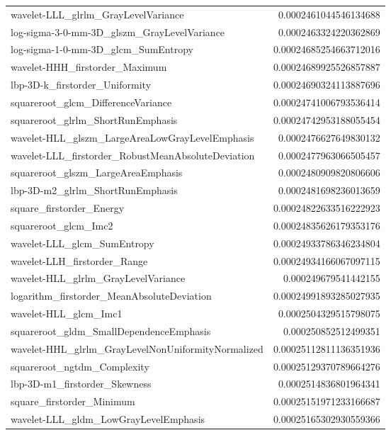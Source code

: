{\begin{xltabular}[H]{\textwidth}{X r}
        wavelet-LLL\_glrlm\_GrayLevelVariance & 0.0002461044546134688 \\
        log-sigma-3-0-mm-3D\_glszm\_GrayLevelVariance & 0.0002463324220362869 \\
        log-sigma-1-0-mm-3D\_glcm\_SumEntropy & 0.00024685254663712016 \\
        wavelet-HHH\_firstorder\_Maximum & 0.00024689925526857887 \\
        lbp-3D-k\_firstorder\_Uniformity & 0.00024690324113887696 \\
        squareroot\_glcm\_DifferenceVariance & 0.00024741006793536414 \\
        squareroot\_glrlm\_ShortRunEmphasis & 0.00024742953188055454 \\
        wavelet-HLL\_glszm\_LargeAreaLowGrayLevelEmphasis & 0.0002476627649830132 \\
        wavelet-LLL\_firstorder\_RobustMeanAbsoluteDeviation & 0.0002477963066505457 \\
        squareroot\_glszm\_LargeAreaEmphasis & 0.0002480909820806606 \\
        lbp-3D-m2\_glrlm\_ShortRunEmphasis & 0.0002481698236013659 \\
        square\_firstorder\_Energy & 0.00024822633516222923 \\
        squareroot\_glcm\_Imc2 & 0.00024835626179353176 \\
        wavelet-LLL\_glcm\_SumEntropy & 0.00024933786346234804 \\
        wavelet-LLH\_firstorder\_Range & 0.00024934166067097115 \\
        wavelet-HLL\_glrlm\_GrayLevelVariance & 0.000249679541442155 \\
        logarithm\_firstorder\_MeanAbsoluteDeviation & 0.00024991893285027935 \\
        wavelet-HLL\_glcm\_Imc1 & 0.0002504329515798075 \\
        squareroot\_gldm\_SmallDependenceEmphasis & 0.000250852512499351 \\
        wavelet-HHL\_glrlm\_GrayLevelNonUniformityNormalized & 0.00025112811136351936 \\
        squareroot\_ngtdm\_Complexity & 0.00025129370789664276 \\
        lbp-3D-m1\_firstorder\_Skewness & 0.0002514836801964341 \\
        square\_firstorder\_Minimum & 0.00025151971233166687 \\
        wavelet-LLL\_gldm\_LowGrayLevelEmphasis & 0.00025165302930559366 \\

\end{xltabular}}
